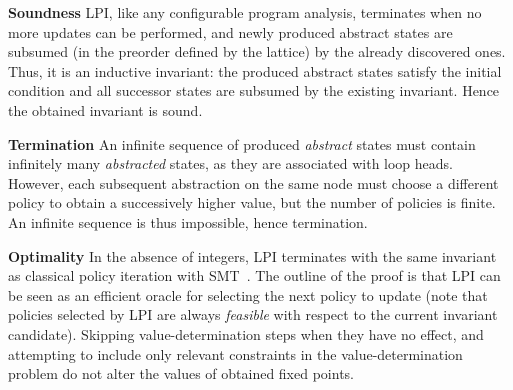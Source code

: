 \documentclass{llncs}
\begin{document}
\noindent\textbf{Soundness} LPI, like any configurable program analysis,
        terminates when no more updates can be performed, and
        newly produced abstract states are subsumed
        (in the preorder defined by the lattice) by the already discovered ones.
        Thus, it is an inductive invariant: the produced abstract states satisfy the
        initial condition and all successor states are subsumed by the existing
        invariant.
        Hence the obtained invariant is sound.

\noindent\textbf{Termination} An infinite sequence of produced \emph{abstract} states must contain
        infinitely many \emph{abstracted} states, as they are associated with
        loop heads.
        However, each subsequent abstraction on the same node must
        choose a different policy to obtain a successively higher value, but the
        number of policies is finite.
        An infinite sequence is thus impossible, hence termination.

\noindent\textbf{Optimality}
    In the absence of integers, LPI terminates with the
    same invariant as classical policy iteration with
    SMT~\cite{policy_iteration_path_focusing}.
    The outline of the proof is that LPI can be seen as an efficient oracle for
    selecting the next policy to update (note that policies selected by LPI are
    always \emph{feasible} with respect to the current invariant candidate).
    Skipping value-determination steps when they have no effect, and attempting to
    include only relevant constraints in the value-determination problem do not
    alter the values of obtained fixed points.
\end{document}
